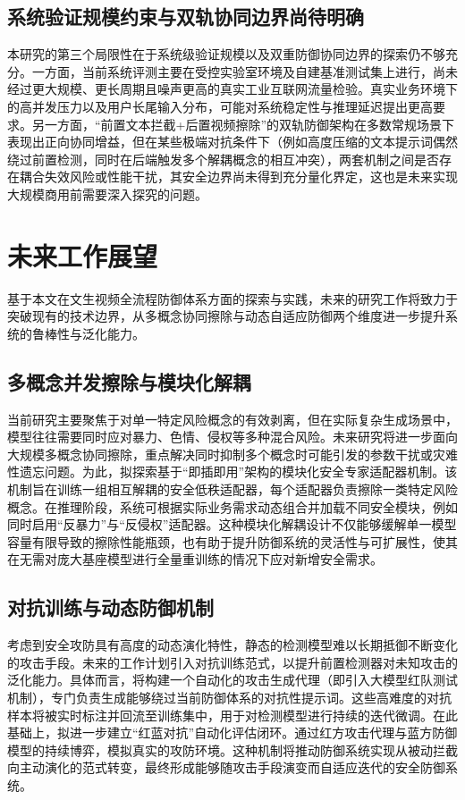 \subsection{系统验证规模约束与双轨协同边界尚待明确}

本研究的第三个局限性在于系统级验证规模以及双重防御协同边界的探索仍不够充分。一方面，当前系统评测主要在受控实验室环境及自建基准测试集上进行，尚未经过更大规模、更长周期且噪声更高的真实工业互联网流量检验。真实业务环境下的高并发压力以及用户长尾输入分布，可能对系统稳定性与推理延迟提出更高要求。另一方面，“前置文本拦截+后置视频擦除”的双轨防御架构在多数常规场景下表现出正向协同增益，但在某些极端对抗条件下（例如高度压缩的文本提示词偶然绕过前置检测，同时在后端触发多个解耦概念的相互冲突），两套机制之间是否存在耦合失效风险或性能干扰，其安全边界尚未得到充分量化界定，这也是未来实现大规模商用前需要深入探究的问题。

\section{未来工作展望}

基于本文在文生视频全流程防御体系方面的探索与实践，未来的研究工作将致力于突破现有的技术边界，从多概念协同擦除与动态自适应防御两个维度进一步提升系统的鲁棒性与泛化能力。

\subsection{多概念并发擦除与模块化解耦}

当前研究主要聚焦于对单一特定风险概念的有效剥离，但在实际复杂生成场景中，模型往往需要同时应对暴力、色情、侵权等多种混合风险。未来研究将进一步面向大规模多概念协同擦除，重点解决同时抑制多个概念时可能引发的参数干扰或灾难性遗忘问题。为此，拟探索基于“即插即用”架构的模块化安全专家适配器机制。该机制旨在训练一组相互解耦的安全低秩适配器，每个适配器负责擦除一类特定风险概念。在推理阶段，系统可根据实际业务需求动态组合并加载不同安全模块，例如同时启用“反暴力”与“反侵权”适配器。这种模块化解耦设计不仅能够缓解单一模型容量有限导致的擦除性能瓶颈，也有助于提升防御系统的灵活性与可扩展性，使其在无需对庞大基座模型进行全量重训练的情况下应对新增安全需求。

\subsection{对抗训练与动态防御机制}

考虑到安全攻防具有高度的动态演化特性，静态的检测模型难以长期抵御不断变化的攻击手段。未来的工作计划引入对抗训练范式，以提升前置检测器对未知攻击的泛化能力。具体而言，将构建一个自动化的攻击生成代理（即引入大模型红队测试机制），专门负责生成能够绕过当前防御体系的对抗性提示词。这些高难度的对抗样本将被实时标注并回流至训练集中，用于对检测模型进行持续的迭代微调。在此基础上，拟进一步建立“红蓝对抗”自动化评估闭环。通过红方攻击代理与蓝方防御模型的持续博弈，模拟真实的攻防环境。这种机制将推动防御系统实现从被动拦截向主动演化的范式转变，最终形成能够随攻击手段演变而自适应迭代的安全防御系统。
